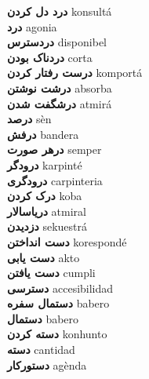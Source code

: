 \textbf{ درد دل کردن  } konsultá \\
\textbf{ درد  } agonia \\
\textbf{ دردسترس  } disponibel \\
\textbf{ دردناک بودن  } corta \\
\textbf{ درست رفتار کردن  } komportá \\
\textbf{ درشت نوشتن  } absorba \\
\textbf{ درشگفت شدن  } atmirá \\
\textbf{ درصد  } sèn \\
\textbf{ درفش  } bandera \\
\textbf{ درهر صورت  } semper \\
\textbf{ درودگر  } karpinté \\
\textbf{ درودگری  } carpinteria \\
\textbf{ درک کردن  } koba \\
\textbf{ دریاسالار  } atmiral \\
\textbf{ دزدیدن  } sekuestrá \\
\textbf{ دست انداختن  } korespondé \\
\textbf{ دست یابی  } akto \\
\textbf{ دست یافتن  } cumpli \\
\textbf{ دسترسی  } accesibilidad \\
\textbf{ دستمال سفره  } babero \\
\textbf{ دستمال  } babero \\
\textbf{ دسته کردن  } konhunto \\
\textbf{ دسته  } cantidad \\
\textbf{ دستورکار  } agènda \\
